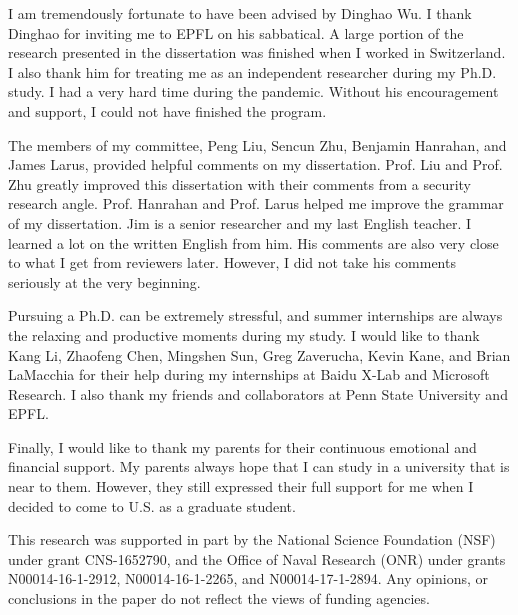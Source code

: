 I am tremendously fortunate to have been advised by Dinghao Wu.  I thank Dinghao for inviting me to EPFL on his sabbatical. A large portion of the research presented in the dissertation was finished when I worked in Switzerland. I also thank him for treating me as an independent researcher during my Ph.D. study. I had a very hard time during the pandemic. Without his encouragement and support, I could not have finished the program.

The members of my committee, Peng Liu, Sencun Zhu, Benjamin Hanrahan, and James Larus, provided helpful comments on my dissertation. Prof. Liu and Prof. Zhu greatly improved this dissertation with their comments from a security research angle. Prof. Hanrahan and Prof. Larus helped me improve the grammar of my dissertation. Jim is a senior researcher and my last English teacher. I learned a lot on the written English from him.  His comments are also very close to what I get from reviewers later. However, I did not take his comments seriously at the very beginning.  

Pursuing a Ph.D. can be extremely stressful, and summer internships are always the relaxing and productive moments during my study. I would like to thank Kang Li, Zhaofeng Chen, Mingshen Sun, Greg Zaverucha, Kevin Kane, and Brian LaMacchia for their help during my internships at Baidu X-Lab and Microsoft Research.  I also thank my friends and collaborators at Penn State University and EPFL. 

Finally, I would like to thank my parents for their continuous emotional and financial support. My parents always hope that I can study in a university that is near to them. However, they still expressed their full support for me when I decided to come to U.S. as a graduate student.

This research was supported in part by the National Science Foundation (NSF) under grant CNS-1652790, and the Office of Naval Research (ONR) under grants N00014-16-1-2912, N00014-16-1-2265, and N00014-17-1-2894. Any opinions, or conclusions in the paper do not reflect the views of funding agencies.

